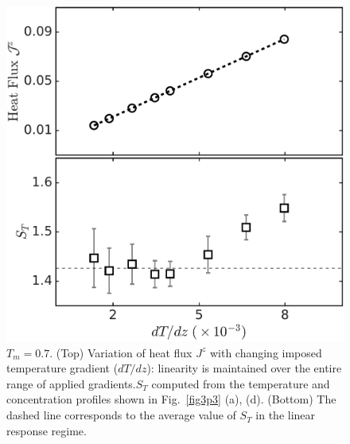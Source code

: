 \begin{figure}[hbt!]
    \centering
	\includegraphics[width=12cm]{figs/fig3p7.pdf}
	\caption[{\em Heat flux and Soret coefficient as function of temperature gradient at $T_m=0.7$}]{$T_m=0.7$. (Top) Variation of heat flux $J^z$ with changing imposed temperature gradient ($dT/dz$): linearity is maintained over the entire range of applied gradients.$S_T$ computed from the temperature and concentration profiles shown in  Fig.~\ref{fig3p3} (a), (d). (Bottom) The dashed line corresponds to the average value of $S_T$ in the linear response regime.\label{fig3p7}}
\end{figure}

